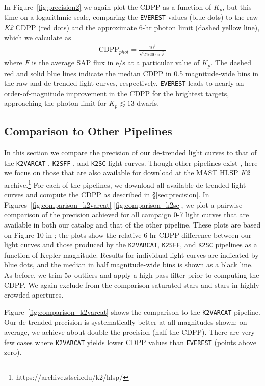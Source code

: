 \documentclass[]{emulateapj}
\begin{document}
In Figure~\ref{fig:precision2} we again plot the CDPP as a function of $K_p$, but this time
on a logarithmic scale, comparing the \texttt{EVEREST} values (blue dots) to the raw \emph{K2}
CDPP (red dots) and the approximate 6-hr photon limit (dashed yellow line), which we calculate as
\begin{align}
\label{eq:phot}
\mathrm{CDPP}_{phot} = \frac{10^6}{\sqrt{21600\times\bar{F}}}
\end{align}
where $\bar{F}$ is the average SAP flux in $\mathrm{e/s}$ at a particular value of $K_p$. The dashed red
and solid blue lines indicate
the median CDPP in 0.5 magnitude-wide bins in the raw and de-trended light curves, respectively.
\texttt{EVEREST} leads to nearly an order-of-magnitude
improvement in the CDPP for the brightest targets, approaching the photon limit for 
$K_p \lesssim 13$ dwarfs.

\subsection{Comparison to Other Pipelines}
\label{sec:comparison}
In this section we compare the precision of our de-trended light curves to that of the
\texttt{K2VARCAT} \citep{ARM15}, \texttt{K2SFF} \citep{VJ14}, and \texttt{K2SC} \citep{AIG16} light curves. Though other
pipelines exist \citep[e.g.,][]{LUN15, HUA15, CRO15}, here we focus on those that 
are also available for download at
the MAST HLSP \emph{K2} archive.\footnote{https://archive.stsci.edu/k2/hlsp/}
For each of the pipelines, we download all available de-trended light curves and
compute the CDPP as described in \S\ref{sec:precision}. In 
Figures~\ref{fig:comparison_k2varcat}-\ref{fig:comparison_k2sc}, we plot a pairwise
comparison of the precision achieved for all campaign 0-7 light curves that are
available in both our catalog and that of the other pipeline. These plots are based
on Figure 10 in \cite{AIG16}; the plots show the relative 6-hr CDPP difference between
our light curves and those produced by the \texttt{K2VARCAT}, \texttt{K2SFF}, and \texttt{K2SC}
pipelines as a function of Kepler magnitude. Results for individual light curves are indicated by
blue dots, and the median in half magnitude-wide bins is shown as a black line.
As before, we trim
5$\sigma$ outliers and apply a high-pass filter prior to computing the CDPP.
We again exclude from the comparison saturated stars and stars in highly crowded apertures.

Figure~\ref{fig:comparison_k2varcat} shows the comparison to the \texttt{K2VARCAT}
pipeline. Our de-trended precision is systematically better at all magnitudes shown;
on average, we achieve about double the precision (half the CDPP). There are very
few cases where \texttt{K2VARCAT} yields lower CDPP values than \texttt{EVEREST}
(points above zero).
\end{document}
